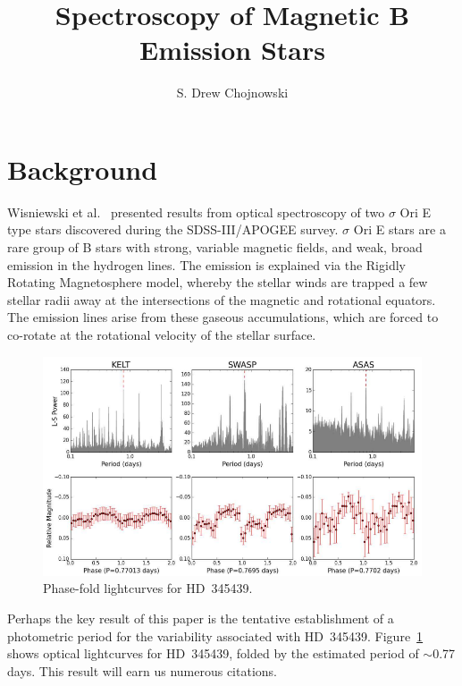 \documentclass{article}
\begin{document}


\title{Spectroscopy of Magnetic B Emission Stars}


\author{S. Drew Chojnowski}

\vspace{0.5cm}

\section{Background}

Wisniewski et al.~\cite{wis15} presented results from optical spectroscopy of two $\sigma$ Ori E type stars discovered during the SDSS-III/APOGEE survey. $\sigma$ Ori E stars are a rare group of B stars with strong, variable magnetic fields, and weak, broad emission in the hydrogen lines. The emission is explained via the Rigidly Rotating Magnetosphere model, whereby the stellar winds are trapped a few stellar radii away at the intersections of the magnetic and rotational equators. The emission lines arise from these gaseous accumulations, which are forced to co-rotate at the rotational velocity of the stellar surface.

\begin{figure}[h!]
\includegraphics[angle=0,scale=.4]{Screenshot-23.png}
\caption{Phase-fold lightcurves for HD~345439. \label{fig1}}
\end{figure}

Perhaps the key result of this paper is the tentative establishment of a photometric period for the variability associated with HD~345439. Figure~\ref{fig1} shows optical lightcurves for HD~345439, folded by the estimated period of $\sim$0.77 days. This result will earn us numerous citations.



{}
\end{document}
